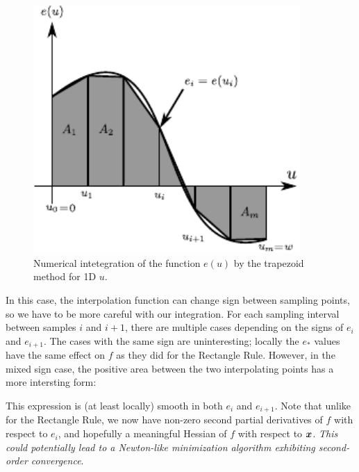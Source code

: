 \documentclass[12pt,journal,draftcls,letterpaper,twocolumn]{IEEEtran}
\begin{document}
\begin{figure}[htb]
 \centering
 \includegraphics[width=4in]{integration_trapezoid.pdf}
 \caption{Numerical intetegration of the function $e(u)$ by the trapezoid method for 1D $u$.}
 \label{fig:trapezoid}
\end{figure}


In this case, the interpolation function can change sign between sampling
points, so we have to be more careful with our integration.  For each sampling
interval between samples $i$ and $i+1$, there are multiple cases depending on
the signs of $e_i$ and $e_{i+1}$.  The cases with the same sign are
uninteresting; locally the $e_*$ values have the same effect on $f$ as they did
for the Rectangle Rule.  However, in the mixed sign case, the positive area
between the two interpolating points has a more intersting form:



This expression is (at least locally) smooth in both $e_i$ and $e_{i+1}$.  Note
that unlike for the Rectangle Rule, we now have non-zero second partial
derivatives of $f$ with respect to $e_i$, and hopefully a meaningful Hessian of
$f$ with respect to ${\boldsymbol{x}}$.  {\em This could potentially lead to a Newton-like
minimization algorithm exhibiting second-order convergence}.  
\end{document}
